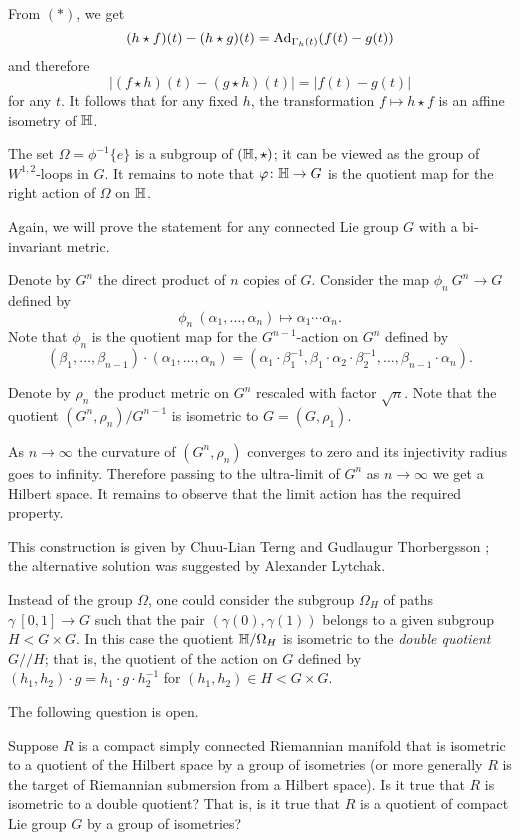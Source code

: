 From $({*})$, we get
\[(h\star f)(t)-(h\star g)(t)=\mathrm{Ad}_{\Gamma_h(t)}(f(t)-g(t))\]
and therefore
\[|(f\star h)(t)-(g\star h)(t)|=|f(t)-g(t)|\]
for any $t$.
It follows that for any fixed $h$,
the transformation $f\mapsto h\star f$ is an affine isometry of $\mathbb{H}$.


The set $\Omega=\phi^{-1}\{e\}$ is a subgroup of $(\mathbb{H},\star)$;
it can be viewed as the group of $W^{1,2}$-loops in $G$.
It remains to note that $\varphi\colon\mathbb{H}\to G$ is the quotient map for the right action of $\Omega$ on $\mathbb{H}$.
\qeds

 Again, we will prove the statement for any connected Lie group $G$ with a bi-invariant metric.

Denote by $G^n$ the direct product of $n$ copies of $G$.
Consider the map $\phi_n\:G^n\to G$ defined by
\[\phi_n\:(\alpha_1,\dots,\alpha_n)\mapsto \alpha_1\cdots\alpha_n.\]
Note that $\phi_n$ is the quotient map for the $G^{n-1}$-action on $G^n$ defined by
\[(\beta_1,\dots,\beta_{n-1})\cdot(\alpha_1,\dots,\alpha_n)=(\alpha_1\cdot\beta_1^{-1},\beta_1\cdot\alpha_2\cdot\beta_2^{-1},\dots,\beta_{n-1}\cdot\alpha_n).\]

Denote by $\rho_n$ the product metric on $G^n$ rescaled with factor $\sqrt{n}$.
Note that the quotient $(G^n,\rho_n)/G^{n-1}$ is isometric to $G=(G,\rho_1)$.

As $n\to\infty$ the curvature of $(G^n,\rho_n)$ converges to zero and its injectivity radius goes to infinity.
Therefore passing to the ultra-limit of $G^n$ as $n\to\infty$ we get a Hilbert space.
It remains to observe that the limit action has the required property.
\qeds

This construction is given by Chuu-Lian Terng and Gudlaugur Thorbergsson \cite[see section 4 in][]{terng-thorbergsson};
the alternative solution was suggested by Alexander Lytchak.

Instead of the group $\Omega$, 
one could consider the subgroup $\Omega_H$ of paths $\gamma\:[0,1]\to G$ such that the pair $(\gamma(0),\gamma(1))$ belongs to a given subgroup $H<G\times G$.
In this case the quotient $\mathbb{H}/\Omega_H$ is isometric to the \emph{double quotient} $G/\!\!/H$;
that is, the quotient of the action on $G$ defined by $(h_1,h_2)\cdot g=h_1\cdot g\cdot h_2^{-1}$ for $(h_1,h_2)\in H<G\times G$.


The following question is open.

\begin{pr} Suppose $R$ is a compact simply connected Riemannian manifold that is isometric to a quotient of the Hilbert space by a group of isometries (or more generally $R$ is the target of Riemannian submersion from a Hilbert space).
Is it true that $R$ is isometric to a double quotient? That is, is it true that $R$ is a quotient of compact Lie group $G$ by a group of isometries?
 
\end{pr}
